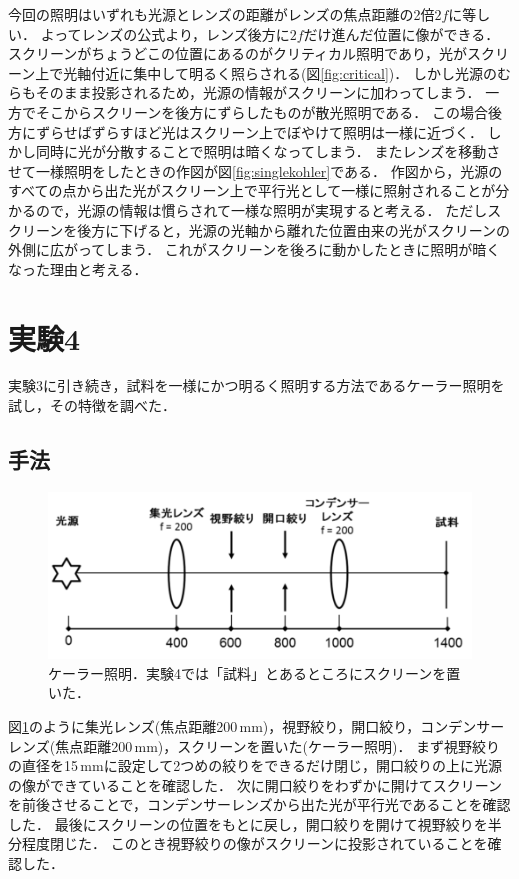 \documentclass[titlepage]{jsarticle}
\begin{document}
今回の照明はいずれも光源とレンズの距離がレンズの焦点距離の2倍$2f$に等しい．
よってレンズの公式より，レンズ後方に$2f$だけ進んだ位置に像ができる．
スクリーンがちょうどこの位置にあるのがクリティカル照明であり，光がスクリーン上で光軸付近に集中して明るく照らされる(図\ref{fig:critical})．
しかし光源のむらもそのまま投影されるため，光源の情報がスクリーンに加わってしまう．
一方でそこからスクリーンを後方にずらしたものが散光照明である．
この場合後方にずらせばずらすほど光はスクリーン上でぼやけて照明は一様に近づく．
しかし同時に光が分散することで照明は暗くなってしまう．
またレンズを移動させて一様照明をしたときの作図が図\ref{fig:singlekohler}である．
作図から，光源のすべての点から出た光がスクリーン上で平行光として一様に照射されることが分かるので，光源の情報は慣らされて一様な照明が実現すると考える．
ただしスクリーンを後方に下げると，光源の光軸から離れた位置由来の光がスクリーンの外側に広がってしまう．
これがスクリーンを後ろに動かしたときに照明が暗くなった理由と考える．

\section{実験4}
実験3に引き続き，試料を一様にかつ明るく照明する方法であるケーラー照明を試し，その特徴を調べた．

\subsection{手法}

\begin{figure}
    \centering
    \includegraphics[width=13cm]{kohler.png}
    \caption{ケーラー照明．実験4では「試料」とあるところにスクリーンを置いた．}
    \label{fig:kohler}
\end{figure}

図\ref{fig:kohler}のように集光レンズ(焦点距離200\,mm)，視野絞り，開口絞り，コンデンサーレンズ(焦点距離200\,mm)，スクリーンを置いた(ケーラー照明)．
まず視野絞りの直径を15\,mmに設定して2つめの絞りをできるだけ閉じ，開口絞りの上に光源の像ができていることを確認した．
次に開口絞りをわずかに開けてスクリーンを前後させることで，コンデンサーレンズから出た光が平行光であることを確認した．
最後にスクリーンの位置をもとに戻し，開口絞りを開けて視野絞りを半分程度閉じた．
このとき視野絞りの像がスクリーンに投影されていることを確認した．
\end{document}
